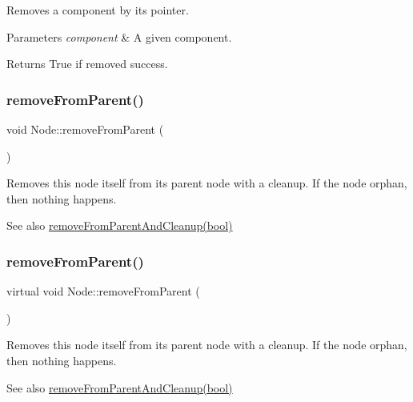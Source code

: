 Removes a component by its pointer.


\begin{DoxyParams}{Parameters}
{\em component} & A given component. \\
\hline
\end{DoxyParams}
\begin{DoxyReturn}{Returns}
True if removed success. 
\end{DoxyReturn}
\mbox{\label{classNode_a26f717b3bf15017bae1a070a121b0289}} 
\subsubsection{\texorpdfstring{remove\+From\+Parent()}{removeFromParent()}\hspace{0.1cm}{\footnotesize\ttfamily [1/2]}}
{\footnotesize\ttfamily void Node\+::remove\+From\+Parent (\begin{DoxyParamCaption}{ }\end{DoxyParamCaption})\hspace{0.3cm}{\ttfamily [virtual]}}

Removes this node itself from its parent node with a cleanup. If the node orphan, then nothing happens. \begin{DoxySeeAlso}{See also}
{\ttfamily \hyperlink{classNode_ad0ee70d65cb9675b64dc447d821a91e5}{remove\+From\+Parent\+And\+Cleanup(bool)}} 
\end{DoxySeeAlso}
\mbox{\label{classNode_a9a2cf07d3723b1394d8943e24a785704}} 
\subsubsection{\texorpdfstring{remove\+From\+Parent()}{removeFromParent()}\hspace{0.1cm}{\footnotesize\ttfamily [2/2]}}
{\footnotesize\ttfamily virtual void Node\+::remove\+From\+Parent (\begin{DoxyParamCaption}{ }\end{DoxyParamCaption})\hspace{0.3cm}{\ttfamily [virtual]}}

Removes this node itself from its parent node with a cleanup. If the node orphan, then nothing happens. \begin{DoxySeeAlso}{See also}
{\ttfamily \hyperlink{classNode_ad0ee70d65cb9675b64dc447d821a91e5}{remove\+From\+Parent\+And\+Cleanup(bool)}} 
\end{DoxySeeAlso}
\mbox{\label{classNode_ad0ee70d65cb9675b64dc447d821a91e5}} 
